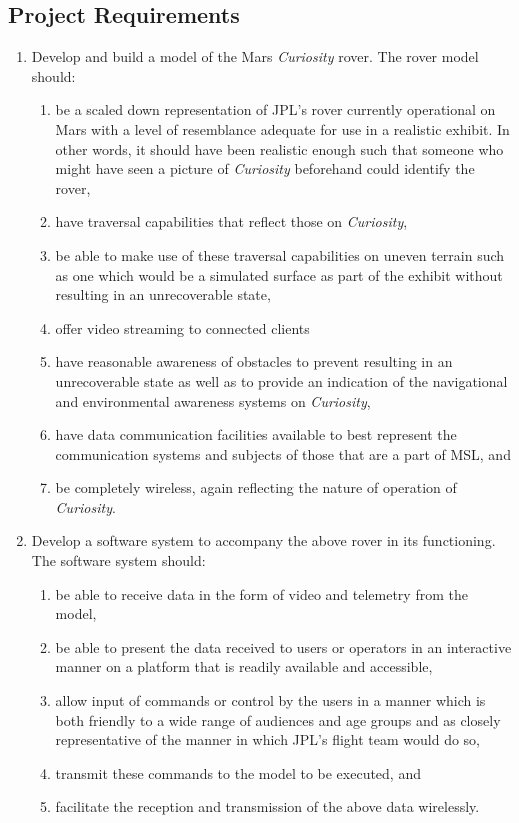   \subsection{Project Requirements}
  \label{subsec:probDef-projectRequirements}
  \begin{enumerate}
    \item Develop and build a model of the Mars \textit{Curiosity} rover. The rover model should:
    \begin{enumerate}
      \item\label{enum:req-scaledrover} be a scaled down representation of JPL's rover currently operational on Mars with a level of resemblance adequate for use in a realistic exhibit. In other words, it should have been realistic enough such that someone who might have seen a picture of \textit{Curiosity} beforehand could identify the rover,
      \item have traversal capabilities that reflect those on \textit{Curiosity},
      \item be able to make use of these traversal capabilities on uneven terrain such as one which would be a simulated surface as part of the exhibit without resulting in an unrecoverable state,
      \item offer video streaming to connected clients
      \item have reasonable awareness of obstacles to prevent resulting in an unrecoverable state as well as to provide an indication of the navigational and environmental awareness systems on \textit{Curiosity},
      \item have data communication facilities available to best represent the communication systems and subjects of those that are a part of MSL, and
      \item be completely wireless, again reflecting the nature of operation of \textit{Curiosity}.
    \end{enumerate}
    \item Develop a software system to accompany the above rover in its functioning. The software system should:
    \begin{enumerate}
      \item be able to receive data in the form of video and telemetry from the model,
      \item be able to present the data received to users or operators in an interactive manner on a platform that is readily available and accessible,
      \item allow input of commands or control by the users in a manner which is both friendly to a wide range of audiences and age groups and as closely representative of the manner in which JPL's flight team would do so,
      \item transmit these commands to the model to be executed, and
      \item facilitate the reception and transmission of the above data wirelessly.
    \end{enumerate}
  \end{enumerate}
  
